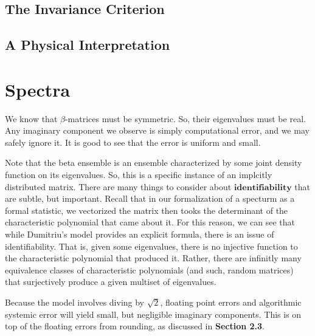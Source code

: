 \ALGbeta


\subsection{The Invariance Criterion}


\subsection{A Physical Interpretation}


\newpage
\section{Spectra}

We know that $\beta$-matrices must be symmetric. So, their eigenvalues must be real. Any imaginary component we observe is simply computational error, and we may safely ignore it.
It is good to see that the error is uniform and small.

\begin{remark}
Note that the beta ensemble is an ensemble characterized by some joint density function on its eigenvalues. So, this is a specific instance of an implcitly distributed matrix.
There are many things to consider about $\textbf{identifiability}$ that are subtle, but important.
Recall that in our formalization of a specturm as a formal statistic, we vectorized the matrix then tooks the determinant of the characteristic polynomial that came about it.
For this reason, we can see that while Dumitriu's model provides an explicit formula, there is an issue of identifiability.
That is, given some eigenvalues, there is no injective function to the characteristic polynomial that produced it.
Rather, there are infinitly many equivalence classes of characteristic polynomials (and such, random matrices) that surjectively produce a given multiset of eigenvalues.
\end{remark}

\begin{remark}
Because the model involves diving by $\sqrt{2}$, floating point errors and algorithmic systemic error will yield small, but negligible imaginary components.
This is on top of the floating errors from rounding, as discussed in \textbf{Section 2.3}.
\end{remark}

